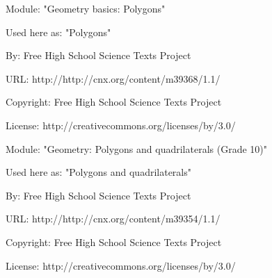      \par\vspace{9pt}\noindent\begin{minipage}{\textwidth}
      Module: "Geometry basics: Polygons" \par\nopagebreak\noindent
      Used here as: "Polygons" \par\nopagebreak\noindent
        By: Free High School Science Texts Project\par\nopagebreak\noindent
      URL: http://http://cnx.org/content/m39368/1.1/\par\nopagebreak\noindent
      \par\nopagebreak\noindent
      Copyright: Free High School Science Texts Project\par\nopagebreak\noindent
      License:  http://creativecommons.org/licenses/by/3.0/\par\nopagebreak\noindent
      \par\end{minipage}
      \par\vspace{9pt}\noindent\begin{minipage}{\textwidth}
      Module: "Geometry: Polygons and quadrilaterals (Grade 10)" \par\nopagebreak\noindent
      Used here as: "Polygons and quadrilaterals" \par\nopagebreak\noindent
        By: Free High School Science Texts Project\par\nopagebreak\noindent
      URL: http://http://cnx.org/content/m39354/1.1/\par\nopagebreak\noindent
      \par\nopagebreak\noindent
      Copyright: Free High School Science Texts Project\par\nopagebreak\noindent
      License:  http://creativecommons.org/licenses/by/3.0/\par\nopagebreak\noindent
      \par\end{minipage}

